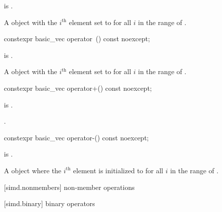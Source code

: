 \begin{itemdescr}
\pnum
\constraints
{} is .

\pnum
\returns
A  object with the $i^\text{th}$ element set to
 for all $i$ in the range of .
\end{itemdescr}

\begin{itemdecl}
constexpr basic_vec operator~() const noexcept;
\end{itemdecl}

\begin{itemdescr}
\pnum
\constraints
{} is .

\pnum
\returns
A  object with the $i^\text{th}$ element set to
 for all $i$ in the range of .
\end{itemdescr}

\begin{itemdecl}
constexpr basic_vec operator+() const noexcept;
\end{itemdecl}

\begin{itemdescr}
\pnum
\constraints
{} is .

\pnum
\returns
{}.
\end{itemdescr}

\begin{itemdecl}
constexpr basic_vec operator-() const noexcept;
\end{itemdecl}

\begin{itemdescr}
\pnum
\constraints
{} is .

\pnum
\returns
A  object where the $i^\text{th}$ element is initialized to
 for all $i$ in the range of .
\end{itemdescr}

[simd.nonmembers]{ non-member operations}

[simd.binary]{ binary operators}

